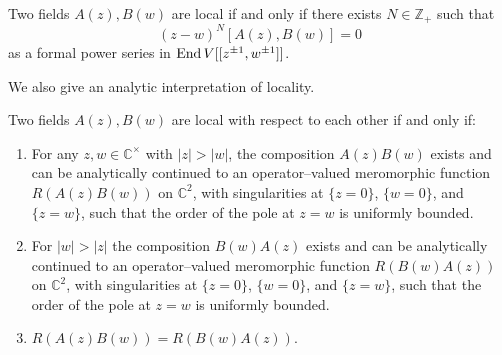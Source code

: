\documentclass[12pt]{article}
\begin{document}
\begin{proposition}
Two fields $A(z),B(w)$ are local if and only if there exists
$N \in \mathbb{Z}_+$ such that
\begin{equation}\label{eq:locality}
    (z-w)^N [A(z),B(w)] = 0
\end{equation}
as a formal power series in $\operatorname{End} V[[z^{\pm1},w^{\pm1}]]$.
\end{proposition}

We also give an analytic interpretation of locality.
\begin{proposition}
Two fields $A(z),B(w)$ are local with respect to each other
if and only if:
\begin{enumerate}
    \item For any $z,w \in \mathbb{C}^\times$ with $|z| > |w|$, 
    the composition $A(z)B(w)$ exists and can be analytically 
    continued to an operator–valued meromorphic function 
    $R(A(z)B(w))$ on $\mathbb{C}^2$, with singularities at 
    $\{z=0\}$, $\{w=0\}$, and $\{z=w\}$, such that the order 
    of the pole at $z=w$ is uniformly bounded.

    \item For $|w| > |z|$ the composition $B(w)A(z)$ exists and can 
    be analytically continued to an operator–valued meromorphic 
    function $R(B(w)A(z))$ on $\mathbb{C}^2$, with singularities 
    at $\{z=0\}$, $\{w=0\}$, and $\{z=w\}$, such that the order 
    of the pole at $z=w$ is uniformly bounded.

    \item $R(A(z)B(w)) = R(B(w)A(z))$.
\end{enumerate}
\end{proposition}
\end{document}
